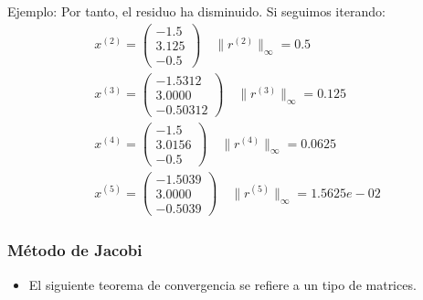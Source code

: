 \documentclass[10pt]{beamer}
\begin{document}
      \begin{frame}{Ejemplo:}
        Por tanto, el residuo ha disminuido. Si seguimos iterando:
        \begin{eqnarray}
          \nonumber x^{(2)} = \left(\begin{array}{c}
               -1.5\\
               3.125\\
               -0.5
               \end{array}\right) \quad \|r^{(2)}\|_\infty=0.5 \\
          \nonumber x^{(3)} = \left(\begin{array}{c}
               -1.5312\\
               3.0000\\
               -0.50312
               \end{array}\right) \quad \|r^{(3)}\|_\infty=0.125\\
               \nonumber x^{(4)} = \left(\begin{array}{c}
                -1.5\\
                3.0156\\
                -0.5
                \end{array}\right) \quad \|r^{(4)}\|_\infty=0.0625 \\
           \nonumber x^{(5)} = \left(\begin{array}{c}
                -1.5039\\
                3.0000\\
                -0.5039
                \end{array}\right) \quad \|r^{(5)}\|_\infty=1.5625e-02
         \end{eqnarray}
      \end{frame}        
      \begin{frame}
      \frametitle{M\'etodo de Jacobi}
      \begin{itemize} 
      \item<1-> El siguiente teorema de convergencia se refiere a un tipo de matrices.
      \end{itemize}
      \end{frame}
\end{document}

